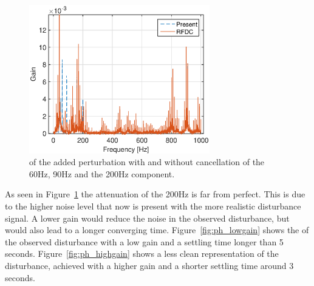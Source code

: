 \begin{figure}[h!]
  \centering
  \includegraphics[width=0.7\textwidth]{fig/matlab/3real_dist_fft.eps}
  \caption{\label{fig:fft_linear} \abbrFFT of the added perturbation with and without cancellation of the 60Hz, 90Hz and the 200Hz component.}
\end{figure}

As seen in Figure~\ref{fig:fft_linear} the attenuation of the 200Hz is far from perfect. This is due to the higher noise level that now is present with the more realistic disturbance signal. A lower gain would reduce the noise in the observed disturbance, but would also lead to a longer converging time. Figure~\ref{fig:ph_lowgain} shows the \abbrFFT of the observed disturbance with a low gain and a settling time longer than 5 seconds. Figure~\ref{fig:ph_highgain} shows a less clean representation of the disturbance, achieved with a higher gain and a shorter settling time around 3 seconds.

